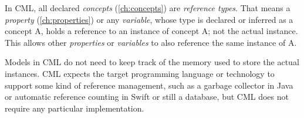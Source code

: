 In CML, all declared \emph{concepts} (\ref{ch:concepts}) are \emph{reference types}.
That means a \emph{property} (\ref{ch:properties}) or any \emph{variable},
whose type is declared or inferred as a concept A, holds a reference
to an instance of concept A; not the actual instance.
This allows other \emph{properties} or \emph{variables}
to also reference the same instance of A.

Models in CML do not need to keep track of the memory used
to store the actual instances.
CML expects the target programming language or technology
to support some kind of reference management,
such as a garbage collector in Java or automatic reference counting in Swift
or still a database,
but CML does not require any particular implementation.
